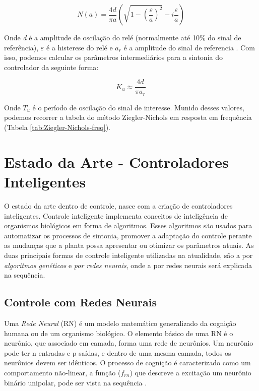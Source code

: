 \begin{equation}\label{eq:n(a)}
  N(a)=\frac{4d}{\pi a}\left(\sqrt{1-\left(\frac{\varepsilon}{a}\right)^{2}}-i\frac{\varepsilon}{a}\right) 
\end{equation}

Onde \textit{d} é a amplitude de oscilação do relé (normalmente até 10\% do sinal de referência), \textit{$\varepsilon$} é a histerese do relé e \textit{$a_r$} é a amplitude do sinal de referencia \cite{Levine1996}. Com isso, podemos calcular os parâmetros intermediários para a sintonia do controlador da seguinte forma:

\begin{equation}
  K_u \approx \frac{4d}{\pi a_r}
\end{equation}

Onde $T_u$ é o período de oscilação do sinal de interesse. Munido desses valores, podemos recorrer a tabela do método Ziegler-Nichols em resposta em frequência (Tabela \ref{tab:Ziegler-Nichols-freq}).



\section{Estado da Arte - Controladores Inteligentes}

O estado da arte dentro de controle, nasce com a criação de controladores inteligentes. Controle inteligente implementa conceitos de inteligência de organismos biológicos em forma de algoritmos. Esses algoritmos são usados para automatizar os processos de sintonia, promover a adaptação do controle perante as mudanças que a planta possa apresentar ou otimizar os parâmetros atuais. As duas principais formas de controle inteligente utilizadas na atualidade, são a por \textit{algoritmos genéticos} e \textit{por redes neurais}, onde a por redes neurais será explicada na sequência.



\subsection{Controle com Redes Neurais}  %

Uma \textit{Rede Neural} (RN) é um modelo matemático generalizado da cognição humana ou de um organismo biológico. O elemento básico de uma RN é o neurônio, que associado em camada, forma uma rede de neurônios. Um neurônio pode ter n entradas e p saídas, e dentro de uma mesma camada, todos os neurônios devem ser idênticos. O processo de cognição é caracterizado como um comportamento não-linear, a função ($f_{rn}$) que descreve a excitação um neurônio binário unipolar,  pode ser vista na sequência \cite{Unal2013}. 

